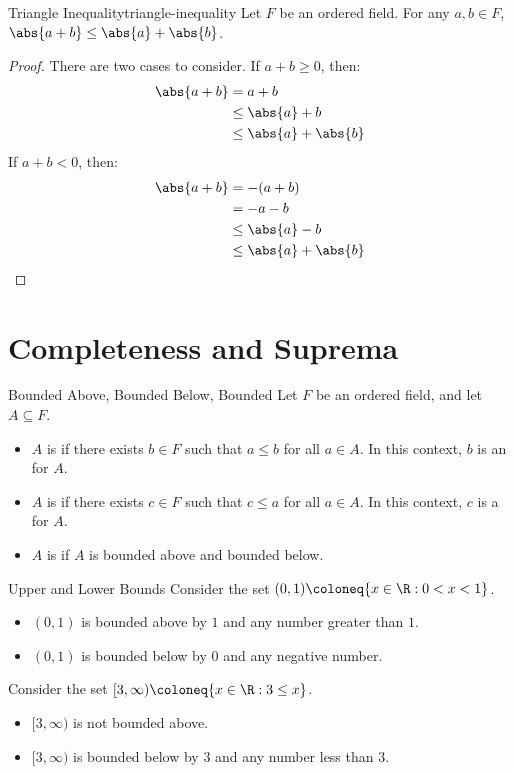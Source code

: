 \begin{thmbox}{Triangle Inequality}{triangle-inequality}
    Let $F$ be an ordered field. For any $a,b \in F$, $\abs{a+b} \leq \abs{a} + \abs{b}$.
    \tcblower
    \begin{proof}
        There are two cases to consider. If $a+b \geq 0$, then:
        \begin{align*}
            \abs{a+b}
            &= a+b \\
            &\leq \abs{a} + b \\
            &\leq \abs{a} + \abs{b}
        \end{align*}
        If $a+b < 0$, then:
        \begin{align*}
            \abs{a+b}
            &= -(a+b) \\
            &= -a-b \\
            &\leq \abs{a} - b \\
            &\leq \abs{a} + \abs{b}
        \end{align*}
    \end{proof}
\end{thmbox}

\section{Completeness and Suprema}

\begin{dfnbox}{Bounded Above, Bounded Below, Bounded}{}
    Let $F$ be an ordered field, and let $A \subseteq F$.
    \begin{itemize}[noitemsep]
        \item $A$ is  if there exists $b \in F$ such that $a \leq b$ for all $a \in A$. In this context, $b$ is an  for $A$.
        \item $A$ is  if there exists $c \in F$ such that $c \leq a$ for all $a \in A$. In this context, $c$ is a  for $A$.
        \item $A$ is  if $A$ is bounded above and bounded below.
    \end{itemize}
\end{dfnbox}

\begin{exbox}{Upper and Lower Bounds}{}
    Consider the set $ (0,1) \coloneq \{ x \in \R : 0<x<1\}$.
    \begin{itemize}[noitemsep]
        \item $(0,1)$ is bounded above by $1$ and any number greater than $1$.
        \item $(0,1)$ is bounded below by $0$ and any negative number.
    \end{itemize}
    Consider the set $[3, \infty) \coloneq \{ x \in \R : 3 \leq x \}$.
    \begin{itemize}[noitemsep]
        \item $[3, \infty)$ is not bounded above.
        \item $[3, \infty)$ is bounded below by $3$ and any number less than $3$.
    \end{itemize}
\end{exbox}

